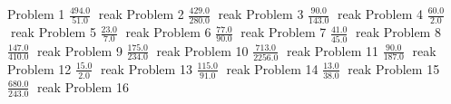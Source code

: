 \documentclass{article}
\begin{document}
Problem 1
\newline
\hfill \break
$\displaystyle \frac{494.0}{51.0}$
\newline
\hfill reak
Problem 2
\newline
\hfill \break
$\displaystyle \frac{429.0}{280.0}$
\newline
\hfill reak
Problem 3
\newline
\hfill \break
$\displaystyle \frac{90.0}{143.0}$
\newline
\hfill reak
Problem 4
\newline
\hfill \break
$\displaystyle \frac{60.0}{2.0}$
\newline
\hfill reak
Problem 5
\newline
\hfill \break
$\displaystyle \frac{23.0}{7.0}$
\newline
\hfill reak
Problem 6
\newline
\hfill \break
$\displaystyle \frac{77.0}{90.0}$
\newline
\hfill reak
Problem 7
\newline
\hfill \break
$\displaystyle \frac{41.0}{45.0}$
\newline
\hfill reak
Problem 8
\newline
\hfill \break
$\displaystyle \frac{147.0}{410.0}$
\newline
\hfill reak
Problem 9
\newline
\hfill \break
$\displaystyle \frac{175.0}{234.0}$
\newline
\hfill reak
Problem 10
\newline
\hfill \break
$\displaystyle \frac{713.0}{2256.0}$
\newline
\hfill reak
Problem 11
\newline
\hfill \break
$\displaystyle \frac{90.0}{187.0}$
\newline
\hfill reak
Problem 12
\newline
\hfill \break
$\displaystyle \frac{15.0}{2.0}$
\newline
\hfill reak
Problem 13
\newline
\hfill \break
$\displaystyle \frac{115.0}{91.0}$
\newline
\hfill reak
Problem 14
\newline
\hfill \break
$\displaystyle \frac{13.0}{38.0}$
\newline
\hfill reak
Problem 15
\newline
\hfill \break
$\displaystyle \frac{680.0}{243.0}$
\newline
\hfill reak
Problem 16
\newline
\end{document}
